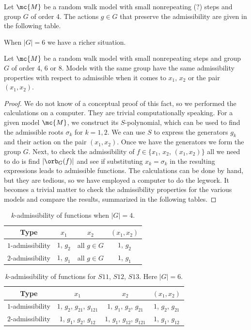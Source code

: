 \begin{prop} Let $\mc{M}$ be a random walk model with small nonrepeating (?) steps and group $G$ of order 4. The actions $g \in G$ that preserve the admissibility are given in the following table.
\end{prop}

When $|G| = 6$ we have a richer situation.

\begin{prop} Let $\mc{M}$ be a random walk model with small nonrepeating steps and group $G$ of order 4, 6 or 8. Models with the same group have the same admissibility properties with respect to admissible when it comes to $x_1$, $x_2$ or the pair $(x_1,x_2)$.
\end{prop}
\begin{proof} We do not know of a conceptual proof of this fact, so we performed the calculations on a computer. They are trivial computationally speaking. For a given model $\mc{M}$, we construct its $S$-polynomial, which can be used to find the admissible roots $\sigma_k$ for $k =1,2$. We can use $S$ to express the generators $g_k$ and their action on the pair $(x_1,x_2)$. Once we have the generators we form the group $G$. Next, to check the admissibility of $f\in \{x_1$, $x_2$, $(x_1,x_2)\}$ all we need to do is find $|\orb_G(f)|$ and see if substituting $x_k = \sigma_k$ in the resulting expressions leads to admissible functions. The calculations can be done by hand, but they are tedious, so we have employed a computer to do the legwork. It becomes a trivial matter to check the admissibility properties for the various models and compare the results, summarized in the following tables.
\end{proof}

\begin{table}[H]
\caption{$k$-admissibility of functions when $|G| = 4$.}
\label{tbl:Admissibility4}
\centering
\begin{tabular}{cccc}
\toprule
	Type & $x_1$  & $x_2$ & $(x_1,x_2)$ \\
\midrule
	$1$-admissibility & $1$, $ g_2$  & all $g\in G$ & $1$, $ g_2$\\
	$2$-admissibility & $1$, $ g_1$  & all $g\in G$ & $1$, $ g_1$\\
\bottomrule
\end{tabular}
\end{table}

\begin{table}[H]
\caption{$k$-admissibility of functions for $S11$, $S12$, $S13$. Here $|G| = 6$.}
\label{tbl:Admissibility61}
\centering
\begin{tabular}{cccc}
\toprule
	Type & $x_1$  & $x_2$ & $(x_1,x_2)$ \\
\midrule
	$1$-admissibility & $1$, $ g_{2} $, $ g_{21} $, $ g_{121}$ & $1$, $ g_{1} $, $ g_{2} $, $ g_{21}$ & $1$, $ g_{2} $, $ g_{21} $ \\
	$2$-admissibility & $1$, $ g_{1} $, $ g_{2} $, $ g_{12}$ & $1$, $ g_{1} $, $ g_{12} $, $ g_{121}$ & $1$, $ g_{1} $, $ g_{12}$ \\
\bottomrule
\end{tabular}
\end{table}

